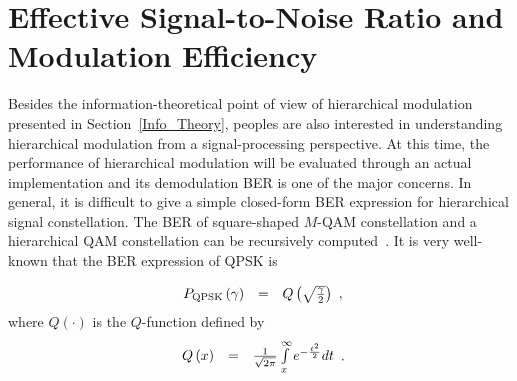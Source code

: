 \documentclass[10pt,fleqn, twocolumn]{IEEEtran}
\begin{document}
\begin{figure}
\end{figure}

\section{Effective Signal-to-Noise Ratio and Modulation Efficiency}
Besides the information-theoretical point of view of hierarchical
modulation presented in Section~\ref{Info_Theory}, peoples are
also interested in understanding hierarchical modulation from a
signal-processing perspective. At this time, the performance of
hierarchical modulation will be evaluated through an actual
implementation and its demodulation BER is one of the major
concerns. In general, it is difficult to give a simple closed-form
BER expression for hierarchical signal constellation. The BER of
square-shaped $M$-QAM constellation and a hierarchical QAM
constellation can be recursively computed~\cite{Yang00,Vitt03}. It
is very well-known that the BER expression of QPSK is

\begin{equation}
\begin{array}{rcl}
P_{\rm
QPSK}\left(\gamma\right)&=&Q\left(\sqrt{\frac{\gamma}{2}}\right)
\end{array},\label{BER_QPSK}
\end{equation}
\noindent where $Q\left(\cdot\right)$ is the $Q$-function defined
by
\begin{equation}\hspace{-0.0in}
\begin{array}{rcl}
Q\left(x\right)&=&\frac{1}{\sqrt{2\pi}}\int\limits_{x}^{\infty}e^{-\frac{t^2}{2}}dt
\end{array}.\label{Q}
\end{equation}
\end{document}
